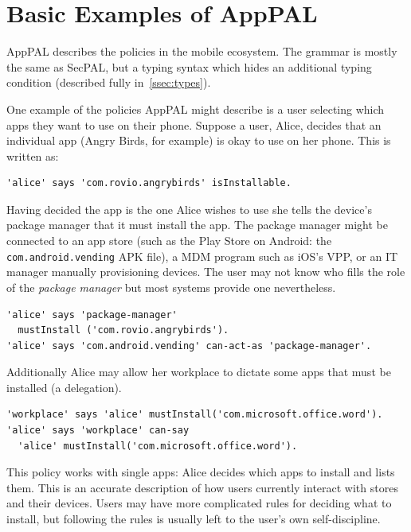 \documentclass[thesis.tex]{subfiles}
\begin{document}
\section{Basic Examples of AppPAL}

AppPAL describes the policies in the mobile ecosystem. The grammar is mostly the
same as SecPAL, but a typing syntax which hides an additional
typing condition (described fully in~\autoref{ssec:types}). 

One example of the policies AppPAL might describe is a user selecting
which apps they want to use on their phone. Suppose a user, Alice,
decides that an individual app (Angry Birds, for example) is okay to
use on her phone. This is written as:

\begin{lstlisting}
'alice' says 'com.rovio.angrybirds' isInstallable.
\end{lstlisting} Having decided the app is the one Alice wishes to use she tells
the device's package manager that it must install the app. The package manager
might be connected to an app store (such as the Play Store on Android: the
\texttt{com.android.vending} APK file), a \ac{MDM} program such as iOS's
\ac{VPP}, or an IT manager manually provisioning devices. The user may not know
who fills the role of the \emph{package manager} but most systems provide one
nevertheless.
\begin{lstlisting}
'alice' says 'package-manager'
  mustInstall ('com.rovio.angrybirds').
'alice' says 'com.android.vending' can-act-as 'package-manager'.
\end{lstlisting}
Additionally Alice may allow her workplace to dictate some apps that must be installed (a delegation).
\begin{lstlisting}
'workplace' says 'alice' mustInstall('com.microsoft.office.word').
'alice' says 'workplace' can-say
  'alice' mustInstall('com.microsoft.office.word').
\end{lstlisting}
This policy works with single apps: Alice decides which apps to
install and lists them.  This is an accurate description of how users
currently interact with stores and their devices.  Users may have more
complicated rules for deciding what to install, but following the
rules is usually left to the user's own self-discipline.
\end{document}

